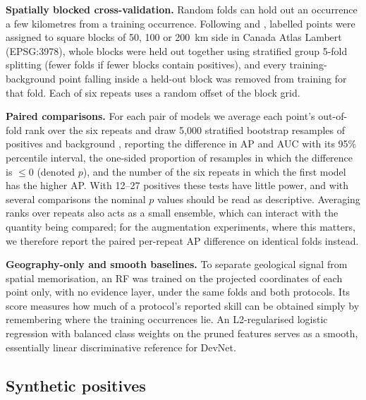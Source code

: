 \documentclass[pdflatex,sn-apa]{sn-jnl}
\begin{document}
\textbf{Spatially blocked cross-validation.} Random folds can hold out an occurrence a few kilometres from a training occurrence. Following \citet{Roberts2017} and \citet{Valavi2019}, labelled points were assigned to square blocks of 50, 100 or 200~km side in Canada Atlas Lambert (EPSG:3978), whole blocks were held out together using stratified group 5-fold splitting (fewer folds if fewer blocks contain positives), and every training-background point falling inside a held-out block was removed from training for that fold. Each of six repeats uses a random offset of the block grid.

\textbf{Paired comparisons.} For each pair of models we average each point's out-of-fold rank over the six repeats and draw 5,000 stratified bootstrap resamples of positives and background \citep{Efron1993}, reporting the difference in AP and AUC with its 95\% percentile interval, the one-sided proportion of resamples in which the difference is $\leq 0$ (denoted $p$), and the number of the six repeats in which the first model has the higher AP. With 12--27 positives these tests have little power, and with several comparisons the nominal $p$ values should be read as descriptive. Averaging ranks over repeats also acts as a small ensemble, which can interact with the quantity being compared; for the augmentation experiments, where this matters, we therefore report the paired per-repeat AP difference on identical folds instead.

\textbf{Geography-only and smooth baselines.} To separate geological signal from spatial memorisation, an RF was trained on the projected coordinates of each point only, with no evidence layer, under the same folds and both protocols. Its score measures how much of a protocol's reported skill can be obtained simply by remembering where the training occurrences lie. An L2-regularised logistic regression with balanced class weights on the pruned features serves as a smooth, essentially linear discriminative reference for DevNet.

\subsection{Synthetic positives}\label{sec:augmentation}
\end{document}
